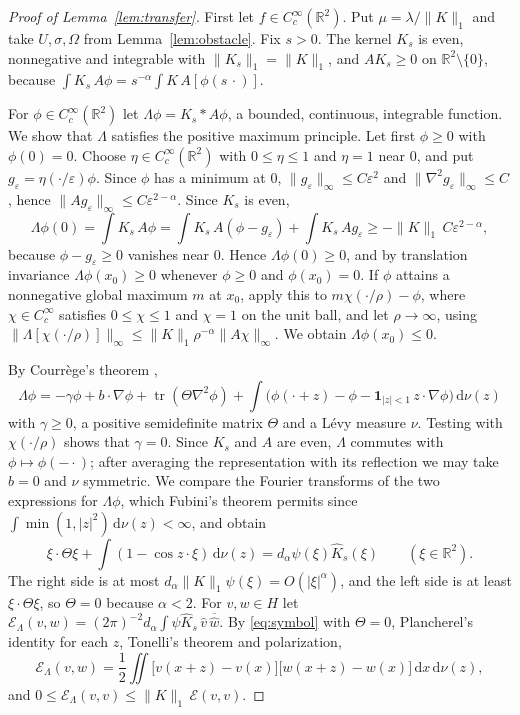 \documentclass[11pt]{amsart}
\theoremstyle{definition}
\theoremstyle{remark}
\numberwithin{equation}{section}
\newcommand{\R}{\mathbb{R}}
\newcommand{\dd}{\,\mathrm{d}}
\newcommand{\Cc}{C_c^\infty}
\begin{document}
\begin{proof}[Proof of Lemma~\ref{lem:transfer}]
First let $f\in\Cc(\R^2)$. Put $\mu=\lambda/\|K\|_1$ and take $U,\sigma,\Omega$ from Lemma~\ref{lem:obstacle}. Fix $s>0$. The kernel $K_s$ is even, nonnegative and integrable with $\|K_s\|_1=\|K\|_1$, and $AK_s\ge0$ on $\R^2\setminus\{0\}$, because $\int K_s\,A\phi=s^{-\alpha}\int K\,A[\phi(s\,\cdot)]$.

For $\phi\in\Cc(\R^2)$ let $\Lambda\phi=K_s*A\phi$, a bounded, continuous, integrable function. We show that $\Lambda$ satisfies the positive maximum principle. Let first $\phi\ge0$ with $\phi(0)=0$. Choose $\eta\in\Cc(\R^2)$ with $0\le\eta\le1$ and $\eta=1$ near $0$, and put $g_\varepsilon=\eta(\cdot/\varepsilon)\phi$. Since $\phi$ has a minimum at $0$, $\|g_\varepsilon\|_\infty\le C\varepsilon^2$ and $\|\nabla^2g_\varepsilon\|_\infty\le C$, hence $\|Ag_\varepsilon\|_\infty\le C\varepsilon^{2-\alpha}$. Since $K_s$ is even,
\[
\Lambda\phi(0)=\int K_s\,A\phi=\int K_s\,A(\phi-g_\varepsilon)+\int K_s\,Ag_\varepsilon\ge-\|K\|_1\,C\varepsilon^{2-\alpha},
\]
because $\phi-g_\varepsilon\ge0$ vanishes near $0$. Hence $\Lambda\phi(0)\ge0$, and by translation invariance $\Lambda\phi(x_0)\ge0$ whenever $\phi\ge0$ and $\phi(x_0)=0$. If $\phi$ attains a nonnegative global maximum $m$ at $x_0$, apply this to $m\chi(\cdot/\rho)-\phi$, where $\chi\in\Cc$ satisfies $0\le\chi\le1$ and $\chi=1$ on the unit ball, and let $\rho\to\infty$, using $\|\Lambda[\chi(\cdot/\rho)]\|_\infty\le\|K\|_1\rho^{-\alpha}\|A\chi\|_\infty$. We obtain $\Lambda\phi(x_0)\le0$.

By Courr\`ege's theorem \cite{Cou64},
\[
\Lambda\phi=-\gamma\phi+b\cdot\nabla\phi+\operatorname{tr}(\Theta\nabla^2\phi)+\int\bigl(\phi(\cdot+z)-\phi-\mathbf 1_{|z|<1}\,z\cdot\nabla\phi\bigr)\dd\nu(z)
\]
with $\gamma\ge0$, a positive semidefinite matrix $\Theta$ and a L\'evy measure $\nu$. Testing with $\chi(\cdot/\rho)$ shows that $\gamma=0$. Since $K_s$ and $A$ are even, $\Lambda$ commutes with $\phi\mapsto\phi(-\cdot)$; after averaging the representation with its reflection we may take $b=0$ and $\nu$ symmetric. We compare the Fourier transforms of the two expressions for $\Lambda\phi$, which Fubini's theorem permits since $\int\min(1,|z|^2)\dd\nu(z)<\infty$, and obtain
\begin{equation}\label{eq:symbol}
\xi\cdot\Theta\xi+\int(1-\cos z\cdot\xi)\dd\nu(z)=d_\alpha\psi(\xi)\hat K_s(\xi)\qquad(\xi\in\R^2).
\end{equation}
The right side is at most $d_\alpha\|K\|_1\psi(\xi)=O(|\xi|^\alpha)$, and the left side is at least $\xi\cdot\Theta\xi$, so $\Theta=0$ because $\alpha<2$. For $v,w\in H$ let $\mathcal E_\Lambda(v,w)=(2\pi)^{-2}d_\alpha\int\psi\hat K_s\,\hat v\,\overline{\hat w}$. By \eqref{eq:symbol} with $\Theta=0$, Plancherel's identity for each $z$, Tonelli's theorem and polarization,
\[
\mathcal E_\Lambda(v,w)=\frac12\iint\bigl[v(x+z)-v(x)\bigr]\bigl[w(x+z)-w(x)\bigr]\dd x\dd\nu(z),
\]
and $0\le\mathcal E_\Lambda(v,v)\le\|K\|_1\,\mathcal E(v,v)$.


\end{proof}
\end{document}
